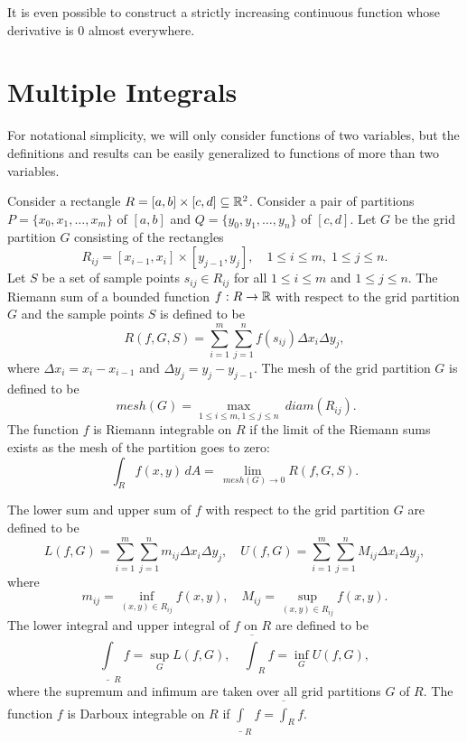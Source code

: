 \begin{rmk}
    It is even possible to construct a strictly increasing continuous function whose derivative is $0$ almost everywhere. 
\end{rmk}

\section{Multiple Integrals}

For notational simplicity, we will only consider functions of two variables, but the definitions and results can be easily generalized to functions of more than two variables.

Consider a rectangle $R = [a, b] \times [c, d] \subseteq {\mathbb R}^2$. Consider a pair of partitions $P = \{x_0, x_1, \ldots, x_m\}$ of $[a, b]$ and $Q = \{y_0, y_1, \ldots, y_n\}$ of $[c, d]$. Let $G$ be the grid partition $G$ consisting of the rectangles
\[
R_{ij} = [x_{i-1}, x_i] \times [y_{j-1}, y_j], \quad 1 \leq i \leq m, \; 1 \leq j \leq n.
\]
Let $S$ be a set of sample points $s_{ij} \in R_{ij}$ for all $1 \leq i \leq m$ and $1 \leq j \leq n$. The Riemann sum of a bounded function $f: R \to {\mathbb R}$ with respect to the grid partition $G$ and the sample points $S$ is defined to be
\[
R(f, G, S) = \sum_{i=1}^m \sum_{j=1}^n f(s_{ij}) \Delta x_i \Delta y_j,
\]
where $\Delta x_i = x_i - x_{i-1}$ and $\Delta y_j = y_j - y_{j-1}$. The mesh of the grid partition $G$ is defined to be
\[
~mesh(G) = \max_{1 \leq i \leq m, 1 \leq j \leq n} ~diam(R_{ij}).
\]
The function $f$ is Riemann integrable on $R$ if the limit of the Riemann sums exists as the mesh of the partition goes to zero:
\[
\int_R f(x, y) \, dA = \lim_{~mesh(G) \to 0} R(f, G, S).
\]

The lower sum and upper sum of $f$ with respect to the grid partition $G$ are defined to be
\[
L(f, G) = \sum_{i=1}^m \sum_{j=1}^n m_{ij} \Delta x_i \Delta y_j, \quad U(f, G) = \sum_{i=1}^m \sum_{j=1}^n M_{ij} \Delta x_i \Delta y_j,
\]
where
\[
m_{ij} = \inf_{(x, y) \in R_{ij}} f(x, y), \quad M_{ij} = \sup_{(x, y) \in R_{ij}} f(x, y).
\]
The lower integral and upper integral of $f$ on $R$ are defined to be
\[
\underline{\int}_R f = \sup_G L(f, G), \quad \overline{\int}_R f = \inf_G U(f, G),
\]
where the supremum and infimum are taken over all grid partitions $G$ of $R$. The function $f$ is Darboux integrable on $R$ if $\underline{\int}_R f = \overline{\int}_R f$.

